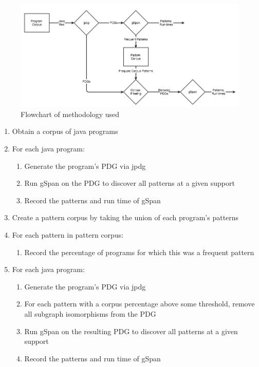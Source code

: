\documentclass[12pt]{article}
\begin{document}
\begin{figure}[ht]
\centerline{
\includegraphics[width=\linewidth]{spec_mining_methodology.png}
}
\caption{\label{mining_methodology}
    Flowchart of methodology used
}
\end{figure}

\begin{enumerate}
    \item Obtain a corpus of java programs
    \item For each java program:
    \begin{enumerate}
        \item Generate the program's PDG via jpdg
        \item Run gSpan on the PDG to discover all patterns at a given support
        \item Record the patterns and run time of gSpan
    \end{enumerate}
    \item Create a pattern corpus by taking the union of each program's patterns
    \item For each pattern in pattern corpus:
    \begin{enumerate}
        \item Record the percentage of programs for which this was a frequent pattern
    \end{enumerate}
    \item For each java program:
    \begin{enumerate}
        \item Generate the program's PDG via jpdg
        \item For each pattern with a corpus percentage above some threshold, remove all subgraph isomorphisms from the PDG
        \item Run gSpan on the resulting PDG to discover all patterns at a given support
        \item Record the patterns and run time of gSpan
    \end{enumerate}
\end{enumerate}
\end{document}
